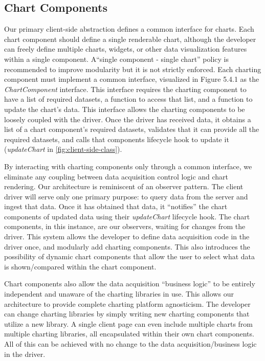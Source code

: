 \subsection{Chart Components}
Our primary client-side abstraction defines a common interface for charts.  Each chart component should define a single renderable chart, although the developer can freely define multiple charts, widgets, or other data visualization features within a single component.  A“single component - single chart” policy is recommended to improve modularity but it is not strictly enforced.  Each charting component must implement a common interface, visualized in Figure 5.4.1 as the \textit{ChartComponent} interface. This interface requires the charting component to have a list of required datasets, a function to access that list, and a function to update the chart’s data.  This interface allows the charting components to be loosely coupled with the driver.  Once the driver has received data, it obtains a list of a chart component’s required datasets, validates that it can provide all the required datasets, and calls that components lifecycle hook to update it (\textit{updateChart} in \ref{fig:client-side-class}). \par
By interacting with charting components only through a common interface, we eliminate any coupling between data acquisition control logic and chart rendering.  Our architecture is reminiscent of an observer pattern.  The client driver will serve only one primary purpose: to query data from the server and ingest that data.  Once it has obtained that data, it “notifies” the chart components of updated data using their \textit{updateChart} lifecycle hook.  The chart components, in this instance, are our observers, waiting for changes from the driver.  This system allows the developer to define data acquisition code in the driver once, and modularly add charting components.  This also introduces the possibility of dynamic chart components that allow the user to select what data is shown/compared within the chart component. \par
Chart components also allow the data acquisition “business logic” to be entirely independent and unaware of the charting libraries in use.  This allows our architecture to provide complete charting platform agnosticism.  The developer can change charting libraries by simply writing new charting components that utilize a new library.  A single client page can even include multiple charts from multiple charting libraries, all encapsulated within their own chart components.  All of this can be achieved with no change to the data acquisition/business logic in the driver. \par
